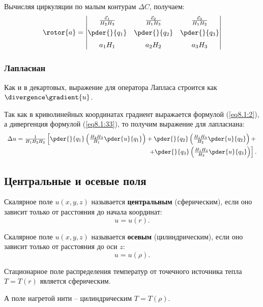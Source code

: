 	Вычисляя циркуляции по малым контурам \( \Delta C \), получаем:
	\begin{equation}
		\rotor{a} = \begin{vmatrix}
		\frac{\vec{e}_1}{H_2H_3} & \frac{\vec{e}_2}{H_1H_3} & \frac{\vec{e}_3}{H_1H_2} \\[0.2cm]
		\pder{}{q_1} & \pder{}{q_2} & \pder{}{q_3} \\[0.2cm]
		a_1H_1 & a_2H_2 & a_3H_3
		\end{vmatrix}
	\end{equation}

\subsubsection{Лапласиан}

	Как и в декартовых, выражение для оператора Лапласа строится как \( \divergence\gradient{u} \).
	
	Так как в криволинейных координатах градиент выражается формулой (\ref{eq8.1:2}), а дивергенция формулой (\ref{eq8.1:33}), то получим выражение для лапласиана:
	\begin{equation}
	\begin{array}{r}
		\Delta u = \frac{1}{H_1H_2H_3}\left[ \pder{}{q_1}\left(\frac{H_2H_3}{H_1}\pder{u}{q_1}\right) + \pder{}{q_2}\left(\frac{H_1H_3}{H_2}\pder{u}{q_2}\right) +\right. \\[0.2cm]
		\left. + \pder{}{q_3}\left(\frac{H_1H_2}{H_3}\pder{u}{q_3}\right)\right].
	\end{array}
	\end{equation}

\subsection{Центральные и осевые поля}

	\begin{definition}
	Скалярное поле \( u(x, y, z) \) называется \textbf{центральным} (сферическим), если оно зависит только от расстояния до начала координат:
	\[ u = u(r). \]
	\end{definition}

	\begin{definition}
	Скалярное поле \( u(x, y, z) \) называется \textbf{осевым} (цилиндрическим), если оно зависит только от расстояния до оси \( z \):
	\[ u = u(\rho). \]
	\end{definition}

	\begin{example}
	Стационарное поле распределения температур от точечного источника тепла \( T = T(r) \) является сферическим.
	
	А поле нагретой нити -- цилиндрическим \( T = T(\rho) \).
	\end{example}
	
